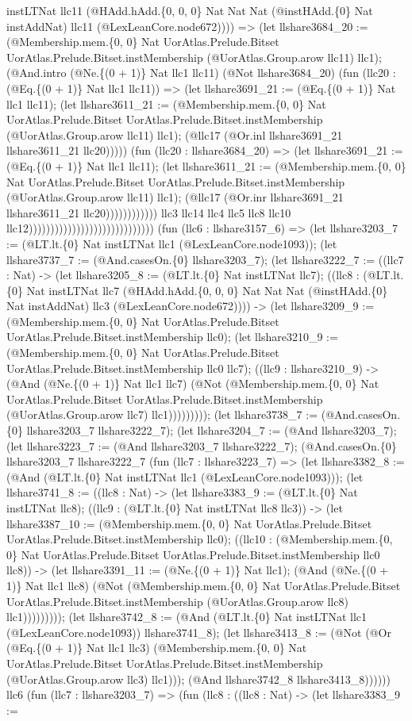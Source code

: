 \documentclass[11pt]{article}
\begin{document}
instLTNat llc11 (@HAdd.hAdd.\{0, 0, 0\} Nat Nat Nat (@instHAdd.\{0\} Nat instAddNat) llc11 (@LexLeanCore.node672)))) => (let llshare3684\_20 := (@Membership.mem.\{0, 0\} Nat UorAtlas.Prelude.Bitset UorAtlas.Prelude.Bitset.instMembership (@UorAtlas.Group.arow llc11) llc1); (@And.intro (@Ne.\{(0 + 1)\} Nat llc1 llc11) (@Not llshare3684\_20) (fun (llc20 : (@Eq.\{(0 + 1)\} Nat llc1 llc11)) => (let llshare3691\_21 := (@Eq.\{(0 + 1)\} Nat llc1 llc11); (let llshare3611\_21 := (@Membership.mem.\{0, 0\} Nat UorAtlas.Prelude.Bitset UorAtlas.Prelude.Bitset.instMembership (@UorAtlas.Group.arow llc11) llc1); (@llc17 (@Or.inl llshare3691\_21 llshare3611\_21 llc20))))) (fun (llc20 : llshare3684\_20) => (let llshare3691\_21 := (@Eq.\{(0 + 1)\} Nat llc1 llc11); (let llshare3611\_21 := (@Membership.mem.\{0, 0\} Nat UorAtlas.Prelude.Bitset UorAtlas.Prelude.Bitset.instMembership (@UorAtlas.Group.arow llc11) llc1); (@llc17 (@Or.inr llshare3691\_21 llshare3611\_21 llc20)))))))))))) llc3 llc14 llc4 llc5 llc8 llc10 llc12))))))))))))))))))))))))))))) (fun (llc6 : llshare3157\_6) => (let llshare3203\_7 := (@LT.lt.\{0\} Nat instLTNat llc1 (@LexLeanCore.node1093)); (let llshare3737\_7 := (@And.casesOn.\{0\} llshare3203\_7); (let llshare3222\_7 := ((llc7 : Nat) -> (let llshare3205\_8 := (@LT.lt.\{0\} Nat instLTNat llc7); ((llc8 : (@LT.lt.\{0\} Nat instLTNat llc7 (@HAdd.hAdd.\{0, 0, 0\} Nat Nat Nat (@instHAdd.\{0\} Nat instAddNat) llc3 (@LexLeanCore.node672)))) -> (let llshare3209\_9 := (@Membership.mem.\{0, 0\} Nat UorAtlas.Prelude.Bitset UorAtlas.Prelude.Bitset.instMembership llc0); (let llshare3210\_9 := (@Membership.mem.\{0, 0\} Nat UorAtlas.Prelude.Bitset UorAtlas.Prelude.Bitset.instMembership llc0 llc7); ((llc9 : llshare3210\_9) -> (@And (@Ne.\{(0 + 1)\} Nat llc1 llc7) (@Not (@Membership.mem.\{0, 0\} Nat UorAtlas.Prelude.Bitset UorAtlas.Prelude.Bitset.instMembership (@UorAtlas.Group.arow llc7) llc1))))))))); (let llshare3738\_7 := (@And.casesOn.\{0\} llshare3203\_7 llshare3222\_7); (let llshare3204\_7 := (@And llshare3203\_7); (let llshare3223\_7 := (@And llshare3203\_7 llshare3222\_7); (@And.casesOn.\{0\} llshare3203\_7 llshare3222\_7 (fun (llc7 : llshare3223\_7) => (let llshare3382\_8 := (@And (@LT.lt.\{0\} Nat instLTNat llc1 (@LexLeanCore.node1093))); (let llshare3741\_8 := ((llc8 : Nat) -> (let llshare3383\_9 := (@LT.lt.\{0\} Nat instLTNat llc8); ((llc9 : (@LT.lt.\{0\} Nat instLTNat llc8 llc3)) -> (let llshare3387\_10 := (@Membership.mem.\{0, 0\} Nat UorAtlas.Prelude.Bitset UorAtlas.Prelude.Bitset.instMembership llc0); ((llc10 : (@Membership.mem.\{0, 0\} Nat UorAtlas.Prelude.Bitset UorAtlas.Prelude.Bitset.instMembership llc0 llc8)) -> (let llshare3391\_11 := (@Ne.\{(0 + 1)\} Nat llc1); (@And (@Ne.\{(0 + 1)\} Nat llc1 llc8) (@Not (@Membership.mem.\{0, 0\} Nat UorAtlas.Prelude.Bitset UorAtlas.Prelude.Bitset.instMembership (@UorAtlas.Group.arow llc8) llc1))))))))); (let llshare3742\_8 := (@And (@LT.lt.\{0\} Nat instLTNat llc1 (@LexLeanCore.node1093)) llshare3741\_8); (let llshare3413\_8 := (@Not (@Or (@Eq.\{(0 + 1)\} Nat llc1 llc3) (@Membership.mem.\{0, 0\} Nat UorAtlas.Prelude.Bitset UorAtlas.Prelude.Bitset.instMembership (@UorAtlas.Group.arow llc3) llc1))); (@And llshare3742\_8 llshare3413\_8)))))) llc6 (fun (llc7 : llshare3203\_7) => (fun (llc8 : ((llc8 : Nat) -> (let llshare3383\_9 := 
\end{document}
